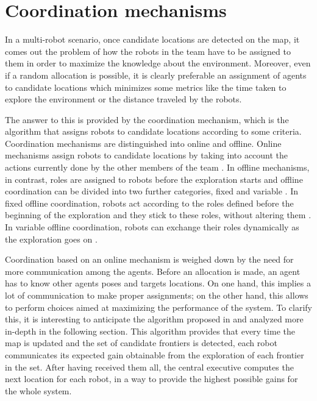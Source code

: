 \section{Coordination mechanisms}

In a multi-robot scenario, once candidate locations are detected on
the map, it comes out the problem of how the robots in the team have
to be assigned to them in order to maximize the knowledge about the
environment. Moreover, even if a random allocation is possible, it
is clearly preferable an assignment of agents to candidate locations
which minimizes some metrics like the time taken to explore the environment
or the distance traveled by the robots. 

The answer to this is provided by the coordination mechanism, which
is the algorithm that assigns robots to candidate locations according
to some criteria. Coordination mechanisms are distinguished into online
and offline. Online mechanisms assign robots to candidate locations
by taking into account the actions currently done by the other members
of the team \cite{Simmons2000,Burgard,Burgard2005}. In offline mechanisms, in contrast,
roles are assigned to robots before the exploration starts and offline
coordination can be divided into two further categories, fixed and
variable \cite{Guzzoni1997}. In fixed offline coordination, robots act according
to the roles defined before the beginning of the exploration and they
stick to these roles, without altering them \cite{Fox2006,Olson2012,Rogers2013,Vincent2008}. In
variable offline coordination, robots can exchange their roles dynamically
as the exploration goes on \cite{Wang2014}. 

Coordination based on an online mechanism is weighed down by the need
for more communication among the agents. Before an allocation is made,
an agent has to know other agents poses and targets locations. On
one hand, this implies a lot of communication to make proper assignments;
on the other hand, this allows to perform choices aimed at maximizing
the performance of the system. To clarify this, it is interesting
to anticipate the algorithm proposed in \cite{Simmons2000} and analyzed more
in-depth in the following section. This algorithm provides that every
time the map is updated and the set of candidate frontiers is detected,
each robot communicates its expected gain obtainable from the exploration
of each frontier in the set. After having received them all, the central
executive computes the next location for each robot, in a way to provide
the highest possible gains for the whole system.

